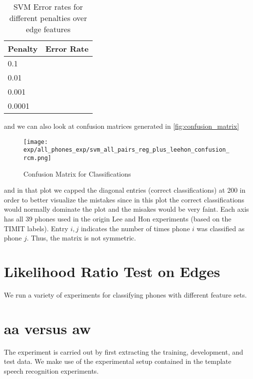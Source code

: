 \documentclass{article}
\begin{document}
\begin{table}[h]
  \centering
  \begin{tabular}{| l |  r |}
    \hline
     Penalty & Error Rate \\ \hline\hline
     0.1 &  \\
     \hline
     0.01 &  \\
     \hline
     0.001 &  \\
     \hline
     0.0001 &   \\
     \hline
  \end{tabular}
  \caption{SVM Error rates for different penalties over edge features}
  \label{tab:myfirsttable}
\end{table}
and we can also look at confusion matrices generated in \autoref{fig:confusion_matrix}
\begin{figure}[h]
\centering
\texttt{[image: exp/all\_phones\_exp/svm\_all\_pairs\_reg\_plus\_leehon\_confusion\_rcm.png]}
\caption{Confusion Matrix for Classifications}
\label{fig:confusion_matrix}
\end{figure}
and in that plot we capped the diagonal entries (correct classifications) at 200
in order to better visualize the mistakes since in this plot the
correct classifications would normally dominate the plot and the misakes would be very faint.  Each axis has all 39 phones used in the origin Lee and Hon experiments (based on the TIMIT labels).  Entry $i,j$ indicates the number of times phone $i$ was classified as phone $j$.  Thus, the matrix is not symmetric.

\section{Likelihood Ratio Test on Edges}



We run a variety of experiments for classifying phones with different feature sets.
\section{aa versus aw}

The experiment is carried out by first extracting the training, development, and test data.  We make use of the
experimental setup contained in the template speech recognition experiments.  
\end{document}
